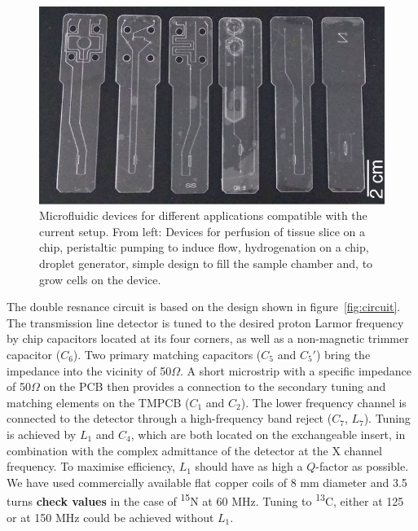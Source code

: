 \documentclass[preprint,12pt]{article}
\newcommand{\todo}[1]{{\color{red}\textbf{#1}}}
\begin{document}
\begin{figure}
\centering
\includegraphics[width=.7\linewidth,keepaspectratio=true]{./figures/ms5n17-tlp-im-181007-devices.png} 
\caption{Microfluidic devices for different applications compatible with the current setup. 
From left: Devices for perfusion of tissue slice on a chip, peristaltic pumping to induce flow, 
hydrogenation on a chip, droplet generator, simple design to fill the sample chamber and, 
to grow cells on the device.}
\label{fig:device} 
\end{figure}

The double resnance circuit is based on the design shown in figure~\ref{fig:circuit}. 
The transmission line detector is tuned to the desired proton 
Larmor frequency by chip capacitors located at its four corners, 
as well as a non-magnetic trimmer capacitor ($C_6$). Two primary 
matching capacitors ($C_5$ and $C_5'$) bring the impedance into the 
vicinity of 50$\Omega$. A short microstrip 
with a specific impedance of 50$\Omega$ 
on the PCB then provides a connection to the secondary tuning and matching elements on the TMPCB ($C_1$ and $C_2$).
The lower frequency channel is connected to the detector through a high-frequency band reject ($C_7$, $L_7$).
Tuning is achieved by $L_1$ and $C_4$, which are both located on the exchangeable insert, in combination with
the complex admittance of the detector at the X channel frequency.
To maximise efficiency, $L_1$ should have as high a $Q$-factor as possible. We have
used commercially available flat copper coils of 8 mm diameter and 3.5 turns \todo{check values} in the case of 
\textsuperscript{15}N at 60 MHz. Tuning to \textsuperscript{13}C, either at 125 or at 150 MHz 
could be achieved without $L_1$. 
\end{document}
